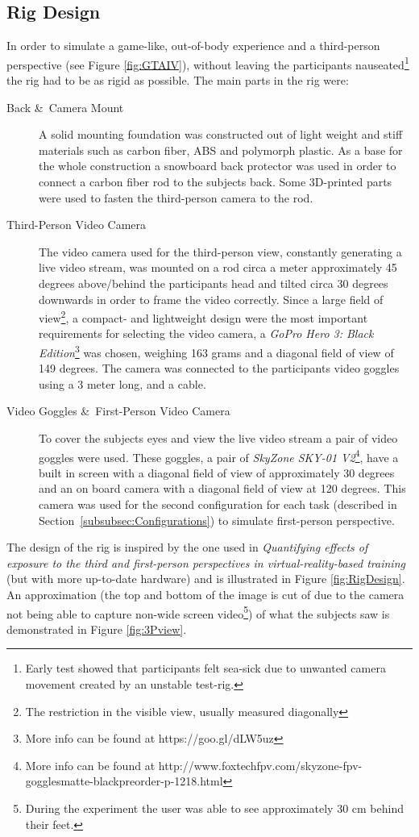 \documentclass[runningheads,a4paper,oribibl]{llncs}
\begin{document}
\subsection{Rig Design}
In order to simulate a game-like, out-of-body experience and a third-person perspective (see Figure \ref{fig:GTAIV}), without leaving the participants nauseated\footnote{Early test showed that participants felt sea-sick due to unwanted camera movement created by an unstable test-rig.} the rig had to be as rigid as possible. The main parts in the rig were:
\begin{description}
   \item[Back \&\ Camera Mount] A solid mounting foundation was constructed out of light weight and stiff materials such as carbon fiber, ABS and polymorph plastic. As a base for the whole construction a snowboard back protector was used in order to connect a carbon fiber rod to the subjects back. Some 3D-printed parts were used to fasten the third-person camera to the rod.

   \item[Third-Person Video Camera] The video camera used for the third-person view, constantly generating a live video stream, was mounted on a rod circa a meter approximately 45 degrees above/behind the participants head and tilted circa 30 degrees downwards in order to frame the video correctly. Since a large field of view\footnote{The restriction in the visible view, usually measured diagonally}, a compact- and lightweight design were the most important requirements for selecting the video camera, a \emph{GoPro Hero 3: Black Edition}\footnote{More info can be found at https://goo.gl/dLW5uz} was chosen, weighing 163 grams and a diagonal field of view of 149 degrees. The camera was connected to the participants video goggles using a 3 meter long,  and a cable.

   \item[Video Goggles \&\ First-Person Video Camera] To cover the subjects eyes and view the live video stream a pair of video goggles were used. These goggles, a pair of \emph{SkyZone SKY-01 V2}\footnote{More info can be found at http://www.foxtechfpv.com/skyzone-fpv-gogglesmatte-blackpreorder-p-1218.html}, have a built in screen with a diagonal field of view of approximately 30 degrees and an on board camera with a diagonal field of view at 120 degrees. This camera was used for the second configuration for each task (described in Section~\ref{subsubsec:Configurations}) to simulate first-person perspective.
\end{description}
The design of the rig is inspired by the one used in \emph{Quantifying effects of exposure to the third and first-person perspectives in virtual-reality-based training}~\cite{salamin2010quantifying} (but with more up-to-date hardware) and is illustrated in Figure \ref{fig:RigDesign}. An approximation (the top and bottom of the image is cut of due to the camera not being able to capture non-wide screen video\footnote{During the experiment the user was able to see approximately 30 cm behind their feet.}) of what the subjects saw is demonstrated in Figure \ref{fig:3Pview}.
\end{document}

